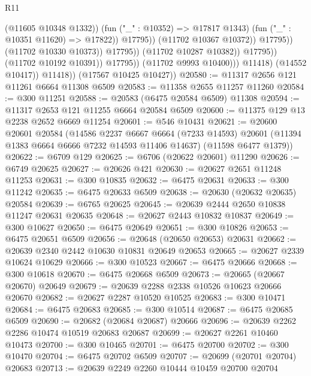 \begin{lexlean}{R11}
\begin{coremodule}
{{{{{{{{{{{{{{{{{{{{{{{{{{{{{{{{{{{{{{{{{{{{{{{{{{{{{{{{{{{{{{{{{{{{{{{{{{{{{{{{{{                                                  (@11605 @10348 @1332))
                                                (fun ("_" : @10352) => @17817 @1343)
                                                (fun ("_" : @10351 @11620) => @17822))
                                              @17795))
                                          (@11702 @10367 @10372))
                                        @17795))
                                    (@11702 @10330 @10373))
                                  @17795))
                              (@11702 @10287 @10382))
                            @17795))
                        (@11702 @10192 @10391))
                      @17795))
                  (@11702 @9993 @10400)))
              @11418)
            (@14552 @10417))
          @11418))
      (@17567 @10425 @10427))
@20580 := @11317 @2656 @121 @11261 @6664 @11308 @6509
@20583 := @11358 @2655 @11257 @11260
@20584 := @300 @11251
@20588 := @20583 (@6475 @20584 @6509) @11308
@20594 := @11317 @2653 @121 @11255 @6664 @20584 @6509
@20600 := @11375 @129 @13 @2238 @2652 @6669 @11254
@20601 := @546 @10431
@20621 := @20600
    @20601
    @20584
    (@14586
      @2237
      @6667
      @6664
      (@7233 @14593)
      @20601
      (@11394 @1383 @6664 @6666 @7232 @14593 @11406 @14637)
      (@11598 @6477 @1379))
@20622 := @6709 @129
@20625 := @6706 (@20622 @20601) @11290
@20626 := @6749 @20625
@20627 := @20626 @421
@20630 := @20627 @2651 @11248 @11253
@20631 := @300 @10835
@20632 := @6475 @20631
@20633 := @300 @11242
@20635 := @6475 @20633 @6509
@20638 := @20630 (@20632 @20635) @20584
@20639 := @6765 @20625
@20645 := @20639 @2444 @2650 @10838 @11247 @20631 @20635
@20648 := @20627 @2443 @10832 @10837
@20649 := @300 @10627
@20650 := @6475 @20649
@20651 := @300 @10826
@20653 := @6475 @20651 @6509
@20656 := @20648 (@20650 @20653) @20631
@20662 := @20639 @2340 @2442 @10630 @10831 @20649 @20653
@20665 := @20627 @2339 @10624 @10629
@20666 := @300 @10523
@20667 := @6475 @20666
@20668 := @300 @10618
@20670 := @6475 @20668 @6509
@20673 := @20665 (@20667 @20670) @20649
@20679 := @20639 @2288 @2338 @10526 @10623 @20666 @20670
@20682 := @20627 @2287 @10520 @10525
@20683 := @300 @10471
@20684 := @6475 @20683
@20685 := @300 @10514
@20687 := @6475 @20685 @6509
@20690 := @20682 (@20684 @20687) @20666
@20696 := @20639 @2262 @2286 @10474 @10519 @20683 @20687
@20699 := @20627 @2261 @10460 @10473
@20700 := @300 @10465
@20701 := @6475 @20700
@20702 := @300 @10470
@20704 := @6475 @20702 @6509
@20707 := @20699 (@20701 @20704) @20683
@20713 := @20639 @2249 @2260 @10444 @10459 @20700 @20704
}}}}}}}}}}}}}}}}}}}}}}}}}}}}}}}}}}}}}}}}}}}}}}}}}}}}}}}}}}}}}}}}}}}}}}}}}}}}}}}}}}
\end{coremodule}
\end{lexlean}
